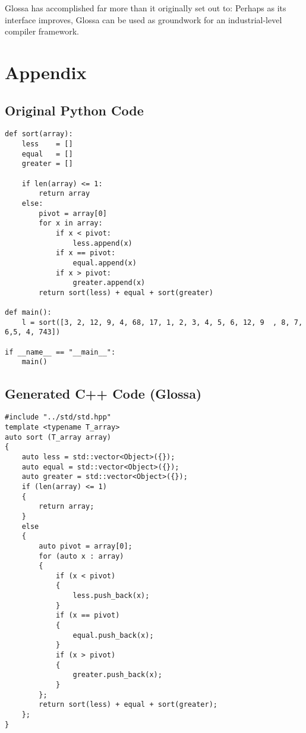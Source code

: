 \documentclass{article}
\begin{document}
Glossa has accomplished far more than it originally set out to: Perhaps as its interface improves, Glossa can be used as groundwork for an industrial-level compiler framework.

\section{Appendix}

\newpage
\subsection{Original Python Code}

\lstset{language=Python}
\begin{lstlisting}
def sort(array):
    less    = []
    equal   = []
    greater = []

    if len(array) <= 1:
        return array
    else:
        pivot = array[0]
        for x in array:
            if x < pivot:
                less.append(x)
            if x == pivot:
                equal.append(x)
            if x > pivot:
                greater.append(x)
        return sort(less) + equal + sort(greater)

def main():
    l = sort([3, 2, 12, 9, 4, 68, 17, 1, 2, 3, 4, 5, 6, 12, 9  , 8, 7, 6,5, 4, 743])

if __name__ == "__main__":
    main()
\end{lstlisting}

\lstset{language=C}

\newpage
\subsection{Generated C++ Code (Glossa)}

\begin{lstlisting}
#include "../std/std.hpp"
template <typename T_array>
auto sort (T_array array)
{
    auto less = std::vector<Object>({});
    auto equal = std::vector<Object>({});
    auto greater = std::vector<Object>({});
    if (len(array) <= 1)
    {
        return array;
    }
    else
    {
        auto pivot = array[0];
        for (auto x : array)
        {
            if (x < pivot)
            {
                less.push_back(x);
            }
            if (x == pivot)
            {
                equal.push_back(x);
            }
            if (x > pivot)
            {
                greater.push_back(x);
            }
        };
        return sort(less) + equal + sort(greater);
    };
}
\end{lstlisting}
\end{document}
